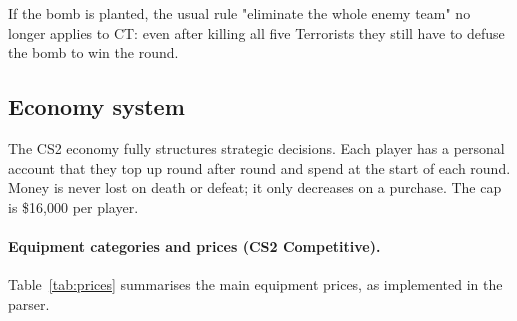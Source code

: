 If the bomb is planted, the usual rule "eliminate the whole enemy
team" no longer applies to CT: even after killing all five
Terrorists they still have to defuse the bomb to win the round.

\subsection{Economy system}
\label{annex:economy}

The CS2 economy fully structures strategic decisions. Each player has
a personal account that they top up round after round and spend at
the start of each round. Money is never lost on death or defeat; it
only decreases on a purchase. The cap is \$16{,}000 per player.

\paragraph{Equipment categories and prices (CS2 Competitive).}
Table~\ref{tab:prices} summarises the main equipment prices, as
implemented in the parser.

